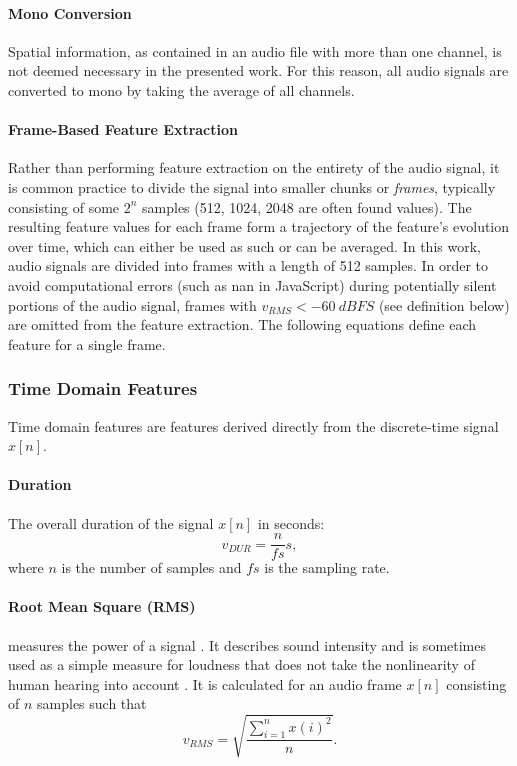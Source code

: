 \paragraph{Mono Conversion}
\label{para:mono_conversion}
Spatial information, as contained in an audio file with more than one channel,
is not deemed necessary in the presented work. For this reason, all audio
signals are converted to mono by taking the average of all channels.

\paragraph{Frame-Based Feature Extraction}
\label{para:frame_based_extraction}
Rather than performing feature extraction on the entirety of the audio signal,
it is common practice to divide the signal into smaller chunks or
\textit{frames}, typically consisting of some $2^n$ samples (512, 1024, 2048
are often found values). The resulting feature values for each frame form a
trajectory of the feature's evolution over time, which can either be used as
such or can be averaged. In this work, audio signals are divided into frames
with a length of 512 samples.
In order to avoid computational errors (such as \gls{nan} in JavaScript) during
potentially silent portions of the audio signal, frames with
$v_{RMS} < \SI{-60}{dBFS}$ (see  definition below) are omitted
from the feature extraction. The following equations define each feature for a
single frame.

\subsubsection{Time Domain Features}
\label{subsubsec:temporal_features}
Time domain features are features derived directly from the discrete-time
signal $x[n]$.

\paragraph{Duration}
\label{para:duration}
The overall duration of the signal $x[n]$ in seconds:
\begin{equation}
  v_{DUR} = \frac{n}{fs}s,
\end{equation}
where $n$ is the number of samples and $fs$ is the sampling rate.

\paragraph{Root Mean Square (RMS)}
\label{para:rms}
measures the power of a signal \citep[p.73f]{lerch2012}. It describes sound intensity and is sometimes used as a simple measure for loudness
\citep{web:meyda2019_features} that does not take the nonlinearity of human
hearing into account \citep{fletcher1933}. It is calculated for an audio
frame $x[n]$ consisting of $n$ samples such that
\begin{equation}
  v_{RMS} = \sqrt{ \frac{ \sum\limits_{i=1}^{n} x(i)^2} {n}}.
\end{equation}

